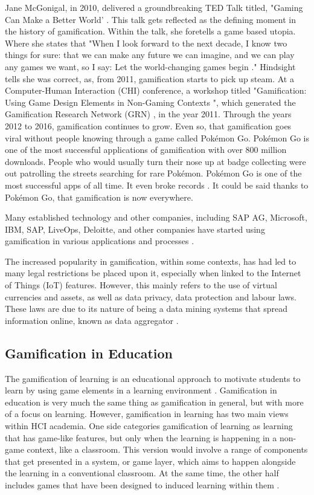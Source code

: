 	Jane McGonigal, in 2010, delivered a groundbreaking TED Talk titled, "Gaming Can Make a Better World' \cite{6}. This talk gets reflected as the defining moment in the history of gamification. Within the talk, she foretells a game based utopia. Where she states that "When I look forward to the next decade, I know two things for sure: that we can make any future we can imagine, and we can play any games we want, so I say: Let the world-changing games begin \cite{6}." Hindsight tells she was correct, as, from 2011, gamification starts to pick up steam.  At a Computer-Human Interaction (CHI) conference, a workshop titled "Gamification: Using Game Design Elements in Non-Gaming Contexts \cite{7}", which generated the Gamification Research Network (GRN) \cite{11}, in the year 2011. Through the years 2012 to 2016, gamification continues to grow. Even so, that gamification goes viral without people knowing through a game called Pokémon Go. Pokémon Go is one of the most successful applications of gamification with over 800 million downloads. People who would usually turn their nose up at badge collecting were out patrolling the streets searching for rare Pokémon. Pokémon Go is one of the most successful apps of all time. It even broke records \cite{3e,8}. It could be said thanks to Pokémon Go, that gamification is now everywhere. 
	
	Many established technology and other companies, including SAP AG, Microsoft, IBM, SAP, LiveOps, Deloitte, and other companies have started using gamification in various applications and processes \cite{9}. 
	
	The increased popularity in gamification, within some contexts, has had led to many legal restrictions be placed upon it, especially when linked to the Internet of Things (IoT) features. However, this mainly refers to the use of virtual currencies and assets, as well as data privacy, data protection and labour laws. These laws are due to its nature of being a data mining systems that spread information online, known as data aggregator \cite{10, 11}. 
	
	
	\subsection{Gamification in Education}
	The gamification of learning is an educational approach to motivate students to learn by using game elements in a learning environment \cite{22}. Gamification in education is very much the same thing as gamification in general, but with more of a focus on learning. However, gamification in learning has two main views within HCI academia. One side categories gamification of learning as learning that has game-like features, but only when the learning is happening in a non-game context, like a classroom. This version would involve a range of components that get presented in a system, or game layer, which aims to happen alongside the learning in a conventional classroom. At the same time, the other half includes games that have been designed to induced learning within them \cite{22}. 
	
